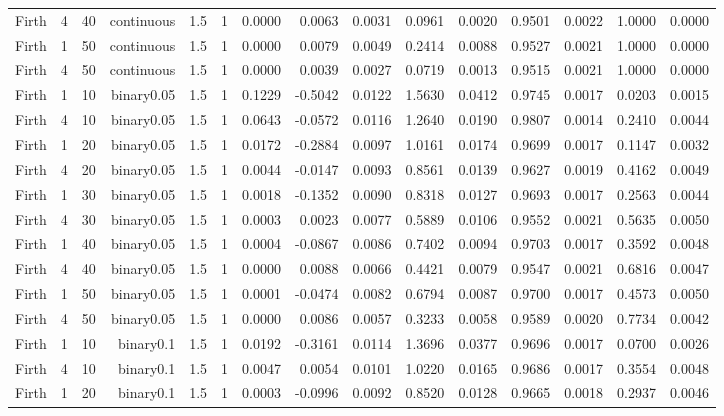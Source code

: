 \begin{longtable}{rrrrrrrrrrrrrrr}
  Firth & 4 & 40 & continuous & 1.5 & 1 & 0.0000 & 0.0063 & 0.0031 & 0.0961 & 0.0020 & 0.9501 & 0.0022 & 1.0000 & 0.0000 \\ 
  Firth & 1 & 50 & continuous & 1.5 & 1 & 0.0000 & 0.0079 & 0.0049 & 0.2414 & 0.0088 & 0.9527 & 0.0021 & 1.0000 & 0.0000 \\ 
  Firth & 4 & 50 & continuous & 1.5 & 1 & 0.0000 & 0.0039 & 0.0027 & 0.0719 & 0.0013 & 0.9515 & 0.0021 & 1.0000 & 0.0000 \\ 
  Firth & 1 & 10 & binary0.05 & 1.5 & 1 & 0.1229 & -0.5042 & 0.0122 & 1.5630 & 0.0412 & 0.9745 & 0.0017 & 0.0203 & 0.0015 \\ 
  Firth & 4 & 10 & binary0.05 & 1.5 & 1 & 0.0643 & -0.0572 & 0.0116 & 1.2640 & 0.0190 & 0.9807 & 0.0014 & 0.2410 & 0.0044 \\ 
  Firth & 1 & 20 & binary0.05 & 1.5 & 1 & 0.0172 & -0.2884 & 0.0097 & 1.0161 & 0.0174 & 0.9699 & 0.0017 & 0.1147 & 0.0032 \\ 
  Firth & 4 & 20 & binary0.05 & 1.5 & 1 & 0.0044 & -0.0147 & 0.0093 & 0.8561 & 0.0139 & 0.9627 & 0.0019 & 0.4162 & 0.0049 \\ 
  Firth & 1 & 30 & binary0.05 & 1.5 & 1 & 0.0018 & -0.1352 & 0.0090 & 0.8318 & 0.0127 & 0.9693 & 0.0017 & 0.2563 & 0.0044 \\ 
  Firth & 4 & 30 & binary0.05 & 1.5 & 1 & 0.0003 & 0.0023 & 0.0077 & 0.5889 & 0.0106 & 0.9552 & 0.0021 & 0.5635 & 0.0050 \\ 
  Firth & 1 & 40 & binary0.05 & 1.5 & 1 & 0.0004 & -0.0867 & 0.0086 & 0.7402 & 0.0094 & 0.9703 & 0.0017 & 0.3592 & 0.0048 \\ 
  Firth & 4 & 40 & binary0.05 & 1.5 & 1 & 0.0000 & 0.0088 & 0.0066 & 0.4421 & 0.0079 & 0.9547 & 0.0021 & 0.6816 & 0.0047 \\ 
  Firth & 1 & 50 & binary0.05 & 1.5 & 1 & 0.0001 & -0.0474 & 0.0082 & 0.6794 & 0.0087 & 0.9700 & 0.0017 & 0.4573 & 0.0050 \\ 
  Firth & 4 & 50 & binary0.05 & 1.5 & 1 & 0.0000 & 0.0086 & 0.0057 & 0.3233 & 0.0058 & 0.9589 & 0.0020 & 0.7734 & 0.0042 \\ 
  Firth & 1 & 10 & binary0.1 & 1.5 & 1 & 0.0192 & -0.3161 & 0.0114 & 1.3696 & 0.0377 & 0.9696 & 0.0017 & 0.0700 & 0.0026 \\ 
  Firth & 4 & 10 & binary0.1 & 1.5 & 1 & 0.0047 & 0.0054 & 0.0101 & 1.0220 & 0.0165 & 0.9686 & 0.0017 & 0.3554 & 0.0048 \\ 
  Firth & 1 & 20 & binary0.1 & 1.5 & 1 & 0.0003 & -0.0996 & 0.0092 & 0.8520 & 0.0128 & 0.9665 & 0.0018 & 0.2937 & 0.0046 \\ 

\end{longtable}
